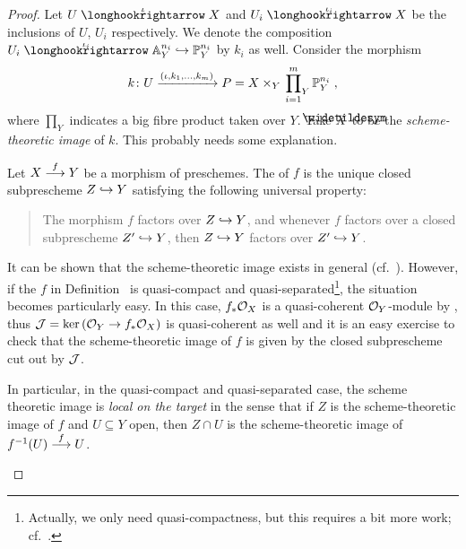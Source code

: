 \documentclass[a4paper,parskip=half,numbers=enddot, DIV=12]{scrreprt}
\begin{document}
\begin{proof}
	Let $U\monomorphism[\iota]X$ and $U_i\monomorphism[\iota_i]X$ be the inclusions of $U$, $U_i$ respectively. We denote the composition $U_i\monomorphism[\iota_i] \IA_Y^{n_i}\monomorphism\IP_Y^{n_i}$ by $k_i$ as well. Consider the morphism
	\begin{align*}
		k\colon U\xrightarrow{(\iota,k_1,\ldots,k_m)}P=X\times_Y\sideset{}{_{Y}}\prod_{i=1}^m\mathbb{P}_Y^{n_i}\;,
	\end{align*}
	where $\prod_{Y}$ indicates a big fibre product taken over $Y$. Take $\snake{X}$ to be the \emph{scheme-theoretic image} of $k$. This probably needs some explanation.
	\begin{defi}
		Let $X\morphism[f]Y$ be a morphism of preschemes. The  of $f$ is the unique closed subprescheme $Z\monomorphism Y$ satisfying the following universal property:
		\begin{quote}
			The morphism $f$ factors over $Z\monomorphism Y$, and whenever $f$ factors over a closed subprescheme $Z'\monomorphism Y$, then $Z\monomorphism Y$ factors over $Z'\monomorphism Y$.
		\end{quote}
	\end{defi}
	\begin{rem}
		\begin{alphanumerate}
			\item{} It can be shown that the scheme-theoretic image exists in general (cf.\ \cite[]{stacks-project}). However, if the $f$ in Definition~ is quasi-compact and quasi-separated\footnote{Actually, we only need quasi-compactness, but this requires a bit more work; cf.\ \cite[]{stacks-project}.}, the situation becomes particularly easy. In this case, $f_*\mathcal{O}_X$ is a quasi-coherent $\mathcal{O}_Y$-module by \cite[Proposition~1.5.2]{alggeo1}, thus $\Jj=\ker\left(\Oo_Y\morphism f_*\Oo_X\right)$ is quasi-coherent as well and it is an easy exercise to check that the scheme-theoretic image of $f$ is given by the closed subprescheme cut out by $\mathcal{J}$.
			
			\item In particular, in the quasi-compact and quasi-separated case, the scheme theoretic image is \emph{local on the target} in the sense that if $Z$ is the scheme-theoretic image of $f$ and $U\subseteq Y$ open, then $Z\cap U$ is the scheme-theoretic image of $f^{-1}(U)\morphism[f]U$.
			

\end{alphanumerate}
\end{rem}
\end{proof}
\end{document}
